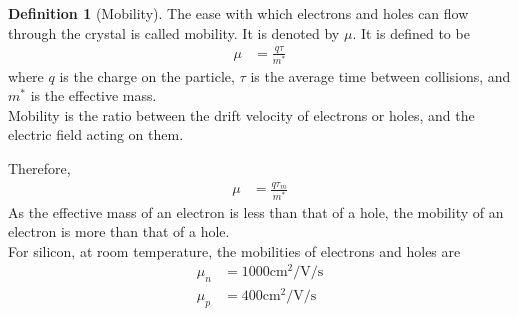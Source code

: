 \documentclass[titlepage, fleqn, a4paper, 12pt, twoside]{article}
\theoremstyle{definition}
\newtheorem{definition}{Definition}
\theoremstyle{theorem}
\begin{document}
\begin{definition}[Mobility]
	The ease with which electrons and holes can flow through the crystal is called mobility.
	It is denoted by $\mu$.
	It is defined to be
	\begin{align*}
		\mu &= \frac{q \tau}{m^*}
	\end{align*}
	where $q$ is the charge on the particle, $\tau$ is the average time between collisions, and $m^*$ is the effective mass.\\
	Mobility is the ratio between the drift velocity of electrons or holes, and the electric field acting on them.
\end{definition}

Therefore,
\begin{align*}
	\mu &= \frac{q \tau_m}{m^*}
\end{align*}
As the effective mass of an electron is less than that of a hole, the mobility of an electron is more than that of a hole.\\
For silicon, at room temperature, the mobilities of electrons and holes are
\begin{align*}
	\mu_n &= 1000 \si{\centi\metre\squared\per\volt\per\second}\\
	\mu_p &= 400 \si{\centi\metre\squared\per\volt\per\second}
\end{align*}

\begin{figure}[H]
	\centering
\end{figure}
\end{document}
